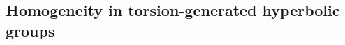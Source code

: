 \documentclass[a4paper, 11pt]{amsart}
\theoremstyle{definition}
\theoremstyle{remark}
\renewcommand{\geq}{\geqslant}
\begin{document}



\subsection{Homogeneity in torsion-generated hyperbolic groups}
\end{document}
